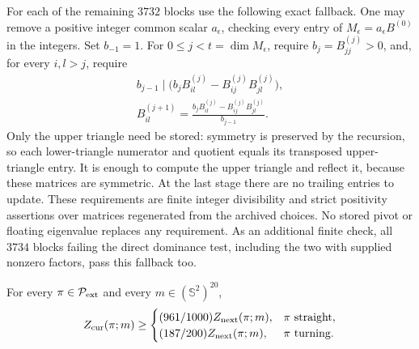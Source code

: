 For each of the remaining \(3732\) blocks use the following exact
fallback. One may remove a positive integer common scalar
\(a_\epsilon\), checking every entry of
\(M_\epsilon=a_\epsilon B^{(0)}\) in the integers.
Set \(b_{-1}=1\). For \(0\le j<t=\dim M_\epsilon\), require
\(b_j=B^{(j)}_{jj}>0\), and, for every \(i,l>j\), require
\[
 \begin{gathered}
 b_{j-1}\mid
   \bigl(b_jB^{(j)}_{il}-B^{(j)}_{ij}B^{(j)}_{jl}\bigr),\\
 B^{(j+1)}_{il}
   =\frac{b_jB^{(j)}_{il}-B^{(j)}_{ij}B^{(j)}_{jl}}{b_{j-1}}.
 \end{gathered}
\]
Only the upper triangle need be stored: symmetry is preserved by
the recursion, so each lower-triangle numerator and quotient equals
its transposed upper-triangle entry.
It is enough to compute the upper triangle and reflect it, because
these matrices are symmetric. At the last stage there are no
trailing entries to update. These requirements are finite integer
divisibility and strict positivity assertions over matrices
regenerated from the archived choices. No stored pivot or floating
eigenvalue replaces any requirement. As an additional finite check,
all \(3734\) blocks failing the direct dominance test, including
the two with supplied nonzero factors, pass this fallback too.

\begin{theorem}\label{t:H1}
For every \(\pi\in\mathcal P_{\rm ext}\) and every
\(m\in(\mathbb S^2)^{20}\),
\[
 Z_{\rm cur}(\pi;m)\ge
 \begin{cases}
 (961/1000)Z_{\rm next}(\pi;m),&\pi\text{ straight},\\
 (187/200)Z_{\rm next}(\pi;m),&\pi\text{ turning}.
 \end{cases}
\]
\end{theorem}

